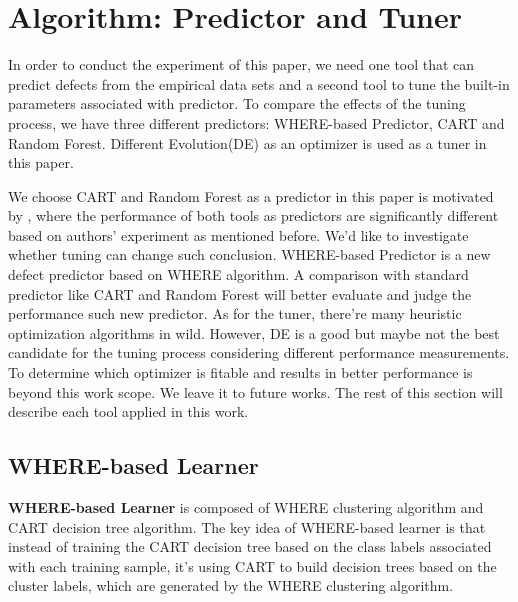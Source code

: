 \section{Algorithm: Predictor and Tuner}

In order to conduct the experiment of this paper, we need one tool that can predict defects 
from the empirical data sets and a second tool to tune the built-in parameters associated with 
predictor. To compare the effects of the tuning process, we have three different predictors: 
WHERE-based Predictor, CART and Random Forest. Different Evolution(DE) as an optimizer 
is used as a tuner in this paper.

We choose CART and Random Forest as a predictor in this paper is motivated by 
\cite{lessmann2008benchmarking}, where the performance of both tools as predictors are 
significantly different based on authors' experiment as mentioned before. We'd like to 
investigate whether tuning can change such conclusion. WHERE-based Predictor is a new 
defect predictor based on WHERE\cite{menzies2013local} algorithm. A comparison with 
standard predictor like CART and Random Forest will better evaluate and judge the 
performance such new predictor. As for the tuner, there're many heuristic optimization 
algorithms in wild. However, DE is a good but maybe not the best candidate for the tuning 
process considering different performance measurements. To determine which optimizer is 
fitable and results in better performance is beyond this work scope. We leave it to future 
works. The rest of this section will describe each tool applied in this work.

 \subsection{WHERE-based Learner}
\textbf{WHERE-based Learner} is composed of WHERE clustering algorithm and CART 
decision tree algorithm. The key idea of WHERE-based learner is that  instead of training the 
CART decision tree based on the class labels associated with each training sample, it's using 
CART to build decision trees based on the cluster labels, which are generated by the WHERE 
clustering algorithm.
 
 
 
